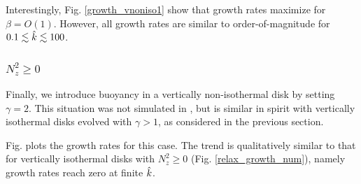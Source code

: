 Interestingly, Fig. \ref{growth_vnoniso1} show that growth rates
maximize for $\beta=O(1)$. However, all growth rates are similar to
order-of-magnitude for $0.1\lesssim\hat{k}\lesssim 100$. 

\subsubsection{$N_z^2\geq0$}


Finally, we introduce buoyancy in a vertically non-isothermal disk by
setting $\gamma=2$. This situation was not simulated in 
\cite{nelson13}, but is similar in spirit with vertically isothermal 
disks evolved with $\gamma>1$, as considered in the previous section. 

Fig. plots the growth rates for this case. The trend is
qualitatively similar to that for vertically isothermal disks with
$N_z^2\geq 0$ (Fig. \ref{relax_growth_num}), namely growth rates reach
zero at finite $\hat{k}$. 

  